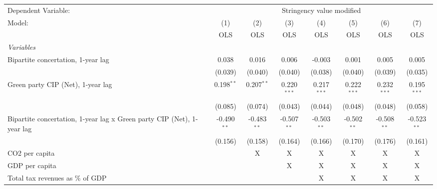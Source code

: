 
\begingroup
\centering
\begin{tabular}{lccccccc}
   \toprule
   Dependent Variable: & \multicolumn{7}{c}{Stringency value modified}\\
   Model:                                                                 & (1)           & (2)           & (3)           & (4)           & (5)           & (6)           & (7)\\  
                                                                          &  OLS          & OLS           & OLS           & OLS           & OLS           & OLS           & OLS\\  
   \midrule
   \emph{Variables}\\
   Bipartite concertation, 1-year lag                                     & 0.038         & 0.016         & 0.006         & -0.003        & 0.001         & 0.005         & 0.005\\   
                                                                          & (0.039)       & (0.040)       & (0.040)       & (0.038)       & (0.040)       & (0.039)       & (0.035)\\   
   Green party CIP (Net), 1-year lag                                      & 0.198$^{**}$  & 0.207$^{**}$  & 0.220$^{***}$ & 0.217$^{***}$ & 0.222$^{***}$ & 0.232$^{***}$ & 0.195$^{***}$\\   
                                                                          & (0.085)       & (0.074)       & (0.043)       & (0.044)       & (0.048)       & (0.048)       & (0.058)\\   
   Bipartite concertation, 1-year lag x Green party CIP (Net), 1-year lag & -0.490$^{**}$ & -0.483$^{**}$ & -0.507$^{**}$ & -0.503$^{**}$ & -0.502$^{**}$ & -0.508$^{**}$ & -0.523$^{**}$\\   
                                                                          & (0.156)       & (0.158)       & (0.164)       & (0.166)       & (0.170)       & (0.176)       & (0.161)\\   
   CO2 per capita                                                         &               & X             & X             & X             & X             & X             & X\\  
   GDP per capita                                                         &               &               & X             & X             & X             & X             & X\\  
   Total tax revenues as \% of GDP                                        &               &               &               & X             & X             & X             & X\\  

\end{tabular}
